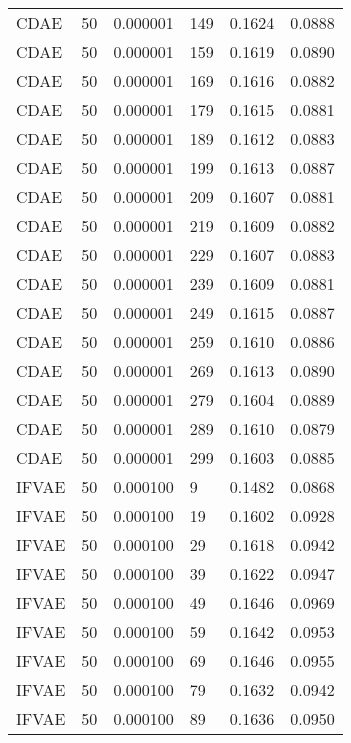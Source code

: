 \begin{tabular}{llrlrr}
    CDAE &   50 &  0.000001 &   149 &  0.1624 &       0.0888 \\
    CDAE &   50 &  0.000001 &   159 &  0.1619 &       0.0890 \\
    CDAE &   50 &  0.000001 &   169 &  0.1616 &       0.0882 \\
    CDAE &   50 &  0.000001 &   179 &  0.1615 &       0.0881 \\
    CDAE &   50 &  0.000001 &   189 &  0.1612 &       0.0883 \\
    CDAE &   50 &  0.000001 &   199 &  0.1613 &       0.0887 \\
    CDAE &   50 &  0.000001 &   209 &  0.1607 &       0.0881 \\
    CDAE &   50 &  0.000001 &   219 &  0.1609 &       0.0882 \\
    CDAE &   50 &  0.000001 &   229 &  0.1607 &       0.0883 \\
    CDAE &   50 &  0.000001 &   239 &  0.1609 &       0.0881 \\
    CDAE &   50 &  0.000001 &   249 &  0.1615 &       0.0887 \\
    CDAE &   50 &  0.000001 &   259 &  0.1610 &       0.0886 \\
    CDAE &   50 &  0.000001 &   269 &  0.1613 &       0.0890 \\
    CDAE &   50 &  0.000001 &   279 &  0.1604 &       0.0889 \\
    CDAE &   50 &  0.000001 &   289 &  0.1610 &       0.0879 \\
    CDAE &   50 &  0.000001 &   299 &  0.1603 &       0.0885 \\
   IFVAE &   50 &  0.000100 &     9 &  0.1482 &       0.0868 \\
   IFVAE &   50 &  0.000100 &    19 &  0.1602 &       0.0928 \\
   IFVAE &   50 &  0.000100 &    29 &  0.1618 &       0.0942 \\
   IFVAE &   50 &  0.000100 &    39 &  0.1622 &       0.0947 \\
   IFVAE &   50 &  0.000100 &    49 &  0.1646 &       0.0969 \\
   IFVAE &   50 &  0.000100 &    59 &  0.1642 &       0.0953 \\
   IFVAE &   50 &  0.000100 &    69 &  0.1646 &       0.0955 \\
   IFVAE &   50 &  0.000100 &    79 &  0.1632 &       0.0942 \\
   IFVAE &   50 &  0.000100 &    89 &  0.1636 &       0.0950 \\

\end{tabular}
